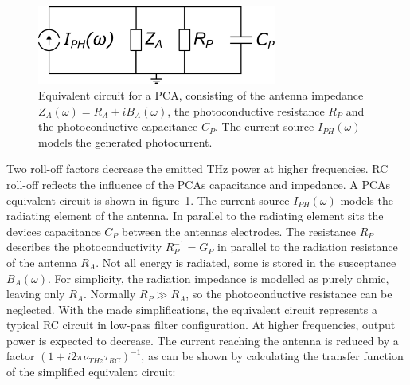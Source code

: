 
\begin{figure}[!]
	\centering
	\includegraphics[width=0.7\textwidth]{figures/eq_circuit_PCA.pdf}
	\captionsetup{width=\textwidth}
	\caption{Equivalent circuit for a PCA, consisting of the antenna impedance $Z_A(\omega) = R_A + iB_A(\omega)$, the photoconductive resistance $R_P$ and the photoconductive capacitance $C_P$. The current source $I_{PH}(\omega)$ models the generated photocurrent.}
	\label{PCA_eq}
\end{figure}

Two roll-off factors decrease the emitted THz power at higher frequencies. RC roll-off reflects the influence of the PCAs capacitance and impedance. A PCAs equivalent circuit \cite{fernandezolveraInternationalSystemUnits2019,collinLimitationsTheveninNorton2003} is shown in figure~\ref{PCA_eq}. The current source $I_{PH}(\omega)$ models the radiating element of the antenna. In parallel to the radiating element sits the devices capacitance $C_P$ between the antennas electrodes. The resistance $R_P$ describes the photoconductivity $R_P^{-1} = G_P$ in parallel to the radiation resistance of the antenna $R_A$. Not all energy is radiated, some is stored in the susceptance $B_A(\omega)$. For simplicity, the radiation impedance is modelled as purely ohmic, leaving only $R_A$. Normally $R_{P} \gg R_A$, so the photoconductive resistance can be neglected.  With the made simplifications, the equivalent circuit represents a typical RC circuit in low-pass filter configuration. At higher frequencies, output power is expected to decrease. The current reaching the antenna is reduced by a factor $(1 + i2\pi \nu_{THz}\tau_{RC})^{-1}$, as can be shown by calculating the transfer function of the simplified equivalent circuit: 


